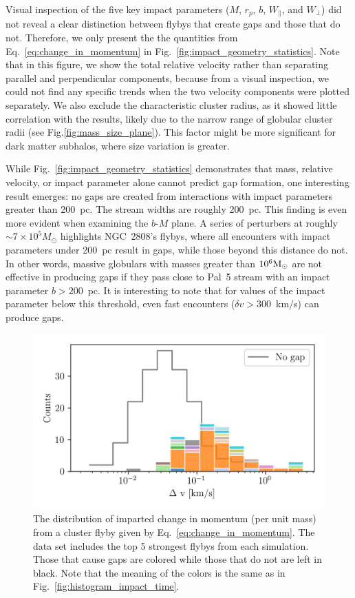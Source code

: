 \documentclass[draft]{aa}
\begin{document}
    Visual inspection of the five key impact parameters ($M$, $r_p$, $b$, $W_\parallel$, and $W_\perp$) did not reveal a clear distinction between flybys that create gaps and those that do not. Therefore, we only present the the quantities from Eq.~\ref{eq:change_in_momentum} in Fig.~\ref{fig:impact_geometry_statistics}. 
    Note that in this figure, we show the total relative velocity rather than separating parallel and perpendicular components, because from a visual inspection, we could not find any specific trends when the two velocity components were plotted separately. We also exclude the characteristic cluster radius, as it showed little correlation with the results, likely due to the narrow range of globular cluster radii (see Fig.\ref{fig:mass_size_plane}). This factor might be more significant for dark matter subhalos, where size variation is greater.
      
      
  
    While Fig.~\ref{fig:impact_geometry_statistics} demonstrates that mass, relative velocity, or impact parameter alone cannot predict gap formation, one interesting result emerges: no gaps are created from interactions with impact parameters greater than 200~pc. The stream widths are roughly 200~pc. This finding is even more evident when examining the $b$-$M$ plane. A series of perturbers at roughly $\sim7 \times 10^5 M_\odot$ highlights NGC~2808's flybys, where all encounters with impact parameters under 200~pc result in gaps, while those beyond this distance do not. In other words, massive globulars with masses greater than $10^6 \rm{M}_\odot$ are not effective in producing gaps if they pass close to Pal~5 stream with an impact parameter $b > 200$~pc. It is interesting to note that for values of the impact parameter below this threshold, even fast encounters ($\delta v > 300$~km/s) can produce gaps. 

    \begin{figure}
      \centering
      \includegraphics[width=1\linewidth]{impact_geometry_statistics_deltaP.png}
      \caption{The distribution of imparted  change in momentum (per unit mass) from a cluster flyby given by Eq.~\ref{eq:change_in_momentum}. The data set includes the top 5 strongest flybys from each simulation. Those that cause gaps are colored while those that do not are left in black. Note that the meaning of the colors is the same as in Fig.~\ref{fig:histogram_impact_time}.}
      \label{fig:deltap}
    \end{figure}
      
\end{document}
